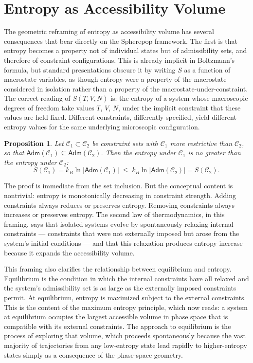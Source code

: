 \documentclass[12pt,openany]{book}
\theoremstyle{plain}
\newtheorem{proposition}[theorem]{Proposition}
\theoremstyle{definition}
\theoremstyle{remark}
\newcommand{\sadm}{\mathsf{Adm}}
\begin{document}
\section{Entropy as Accessibility Volume}

The geometric reframing of entropy as accessibility volume has several consequences that bear directly on the Spherepop framework. The first is that entropy becomes a property not of individual states but of admissibility sets, and therefore of constraint configurations. This is already implicit in Boltzmann's formula, but standard presentations obscure it by writing $S$ as a function of macrostate variables, as though entropy were a property of the macrostate considered in isolation rather than a property of the macrostate-under-constraint. The correct reading of $S(T, V, N)$ is: the entropy of a system whose macroscopic degrees of freedom take values $T$, $V$, $N$, under the implicit constraint that these values are held fixed. Different constraints, differently specified, yield different entropy values for the same underlying microscopic configuration.

\begin{proposition}
Let $\mathcal{C}_1 \subset \mathcal{C}_2$ be constraint sets with $\mathcal{C}_1$ more restrictive than $\mathcal{C}_2$, so that $\sadm(\mathcal{C}_1) \subseteq \sadm(\mathcal{C}_2)$. Then the entropy under $\mathcal{C}_1$ is no greater than the entropy under $\mathcal{C}_2$:
\[
  S(\mathcal{C}_1) = k_B \ln \lvert \sadm(\mathcal{C}_1) \rvert \;\leq\;
  k_B \ln \lvert \sadm(\mathcal{C}_2) \rvert = S(\mathcal{C}_2).
\]
\end{proposition}

The proof is immediate from the set inclusion. But the conceptual content is nontrivial: entropy is monotonically decreasing in constraint strength. Adding constraints always reduces or preserves entropy. Removing constraints always increases or preserves entropy. The second law of thermodynamics, in this framing, says that isolated systems evolve by spontaneously relaxing internal constraints — constraints that were not externally imposed but arose from the system's initial conditions — and that this relaxation produces entropy increase because it expands the accessibility volume.

This framing also clarifies the relationship between equilibrium and entropy. Equilibrium is the condition in which the internal constraints have all relaxed and the system's admissibility set is as large as the externally imposed constraints permit. At equilibrium, entropy is maximized subject to the external constraints. This is the content of the maximum entropy principle, which now reads: a system at equilibrium occupies the largest accessible volume in phase space that is compatible with its external constraints. The approach to equilibrium is the process of exploring that volume, which proceeds spontaneously because the vast majority of trajectories from any low-entropy state lead rapidly to higher-entropy states simply as a consequence of the phase-space geometry.
\end{document}
